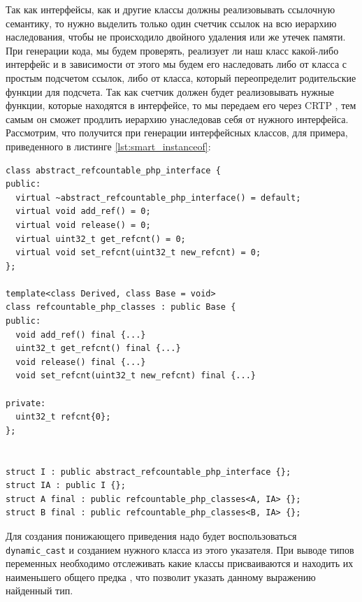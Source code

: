 Так как интерфейсы, как и другие классы должны реализовывать ссылочную семантику, то нужно выделить только один счетчик ссылок на всю иерархию наследования, чтобы не происходило двойного удаления или же утечек памяти.
При генерации кода, мы будем проверять, реализует ли наш класс какой-либо интерфейс и в зависимости от этого мы будем его наследовать либо от класса с простым подсчетом ссылок, либо от класса, который переопределит родительские функции для подсчета.
Так как счетчик должен будет реализовывать нужные функции, которые находятся в интерфейсе, то мы передаем его через CRTP , тем самым он сможет продлить иерархию унаследовав себя от нужного интерфейса.
Рассмотрим, что получится при генерации интерфейсных классов, для примера, приведенного в листинге \ref{lst:smart_instanceof}:
\begin{lstlisting}
class abstract_refcountable_php_interface {
public:
  virtual ~abstract_refcountable_php_interface() = default;
  virtual void add_ref() = 0;
  virtual void release() = 0;
  virtual uint32_t get_refcnt() = 0;
  virtual void set_refcnt(uint32_t new_refcnt) = 0;
};

template<class Derived, class Base = void>
class refcountable_php_classes : public Base {
public:
  void add_ref() final {...}
  uint32_t get_refcnt() final {...}
  void release() final {...}
  void set_refcnt(uint32_t new_refcnt) final {...}

private:
  uint32_t refcnt{0};
};


struct I : public abstract_refcountable_php_interface {};
struct IA : public I {};
struct A final : public refcountable_php_classes<A, IA> {};
struct B final : public refcountable_php_classes<B, IA> {};
\end{lstlisting}

Для создания понижающего приведения надо будет воспользоваться \verb|dynamic_cast| и созданием нужного класса из этого указателя.
При выводе типов переменных необходимо отслеживать какие классы присваиваются и находить их наименьшего общего предка \cite{lca}, что позволит указать данному выражению найденный тип.

